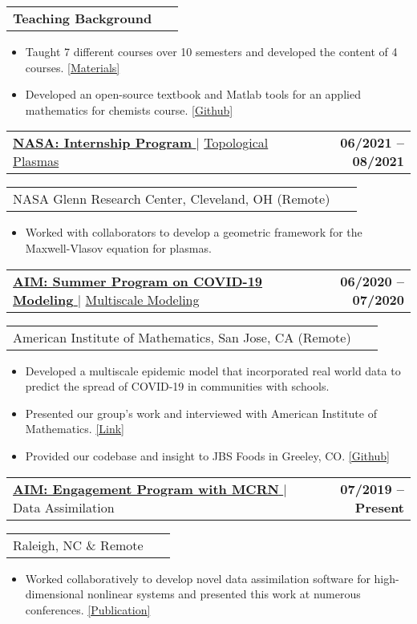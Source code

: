 \documentclass[letterpaper,11pt]{article}
\makeatletter
\newcommand{\accentcolor}[1]{\textcolor{accentcolor}{#1}}
\newcommand{\resumeItem}[1]{
  \item\small{
    {#1 \vspace{-2pt}}
  }
}
\newcommand{\resumeProjectHeading}[2]{
    \item
    \begin{tabular*}{1.001\textwidth}{l@{\extracolsep{\fill}}r}
      \small#1 & \textbf{\small #2}\\
    \end{tabular*}\vspace{-7pt}
}
\newcommand{\resumeItemListStart}{\begin{itemize}}
\newcommand{\resumeItemListEnd}{\end{itemize}\vspace{-5pt}}
\makeatother
\begin{document}
\resumeProjectHeading{\bf{Teaching Background}}{~}
\resumeItemListStart
            \resumeItem{\normalsize{Taught 7 different courses over 10 semesters and developed the content of 4 courses.} \href{https://www.colinroberts.net/teaching.html}{\accentcolor{[Materials]}}}
            \resumeItem{\normalsize{Developed an open-source textbook and Matlab tools for an applied mathematics for chemists course. \href{https://github.com/ColinPR/mathematics_for_physicists_and_chemists.git}{\accentcolor{[Github]}}}}
          \resumeItemListEnd
\vspace*{-10pt}
       \resumeProjectHeading
          {\href{https://intern.nasa.gov/}{\textbf{\large{NASA: Internship Program} \small{\raisebox{-0.1\height}\faExternalLinkSquareAlt}}} $|$ \href{https://www.mathjobs.org/jobs/list/17245?rss}{\large{Topological Plasmas}}}{06/2021 -- 08/2021}
        \resumeProjectHeading{NASA Glenn Research Center, Cleveland, OH (Remote)}{~}
          \resumeItemListStart
            \resumeItem{\normalsize{Worked with collaborators to develop a geometric framework for the Maxwell-Vlasov equation for plasmas.}}
          \resumeItemListEnd
      \resumeProjectHeading{\href{https://aimath.org/workshops/upcoming/mcrn2020/}{\textbf{\large{AIM: Summer Program on COVID-19 Modeling} \small{\raisebox{-0.1\height}\faExternalLinkSquareAlt}}} $|$ \href{https://mathcommunities.org/taking-aim-at-covid-19/}{\large{Multiscale Modeling}}}{06/2020 -- 07/2020}
        \resumeProjectHeading{American Institute of Mathematics, San Jose, CA (Remote)}{~}
          \resumeItemListStart
            \resumeItem{\normalsize{Developed a multiscale epidemic model that incorporated real world data to predict the spread of COVID-19 in communities with schools.}} 
			\resumeItem{\normalsize{Presented our group's work and interviewed with American Institute of Mathematics. \href{https://mathcommunities.org/taking-aim-at-covid-19/}{\accentcolor{[Link]}}}}
			\resumeItem{\normalsize{Provided our codebase and insight to JBS Foods in Greeley, CO.} \href{https://github.com/clairevalva/mcrn_multi_DA}{\accentcolor{[Github]}}}
          \resumeItemListEnd

          \resumeProjectHeading
          {\href{https://aimath.org/workshops/upcoming/mcrn2019/}{\textbf{\large{AIM: Engagement Program with MCRN}} \href{https://www.sciencedirect.com/science/article/abs/pii/S0898122121002121}{\raisebox{-0.1\height}\faExternalLinkSquareAlt }} $|$ \large{Data Assimilation}}{07/2019 -- Present}
        \resumeProjectHeading{Raleigh, NC \& Remote}{~}
          \resumeItemListStart
            \resumeItem{\normalsize{Worked collaboratively to develop novel data assimilation software for high-dimensional nonlinear systems and presented this work at numerous conferences. \href{https://www.sciencedirect.com/science/article/abs/pii/S0898122121002121}{\accentcolor{[Publication]}}}}
          \resumeItemListEnd
\end{document}
